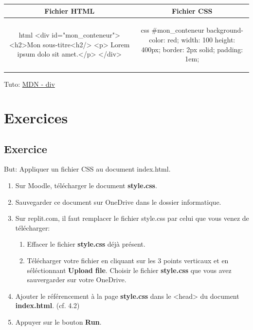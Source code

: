 \documentclass[a4paper,11pt]{article}
\begin{document}
\begin{tabular}{|c|c|}
\hline
\centering Fichier HTML & Fichier CSS\tabularnewline
\hline
\begin{minipage}{1\textwidth}
\begin{code}{html}
<div id="mon_conteneur">
  <h2>Mon sous-titre<h2/>
  <p> Lorem ipsum dolo sit amet.</p>
</div>
\end{code}
\end{minipage}&
\begin{minipage}{1\textwidth}
\begin{code}{css}
#mon_conteneur{
  background-color: red;
  width: 100%
  height: 400px;
  border: 2px solid;
  padding: 1em;
}
\end{code}
\end{minipage}\tabularnewline
\hline
\end{tabular}\par

Tuto: \href{https://developer.mozilla.org/fr/docs/Web/HTML/Element/div}{MDN - div}

\section{Exercices}
\subsection{Exercice}
But: Appliquer un fichier CSS au document index.html.
\begin{enumerate}
\item Sur Moodle, télécharger le document \textbf{style.css}.
\item Sauvegarder ce document sur OneDrive dans le dossier informatique.
\item Sur replit.com, il faut remplacer le fichier style.css par celui que vous venez de télécharger:
\begin{enumerate}
  \item Effacer le fichier \textbf{style.css} déjà présent.
  \item Télécharger votre fichier en cliquant sur les 3 points verticaux et en séléctionnant \textbf{Upload file}. Choisir le fichier \textbf{ style.css} que vous avez sauvergarder sur votre OneDrive.
\end{enumerate}
\item Ajouter le référencement à la page \textbf{style.css} dans le <head> du document \textbf{index.html}. (cf. 4.2)
\item Appuyer sur le bouton \textbf{Run}.
\end{enumerate}
\end{document}
